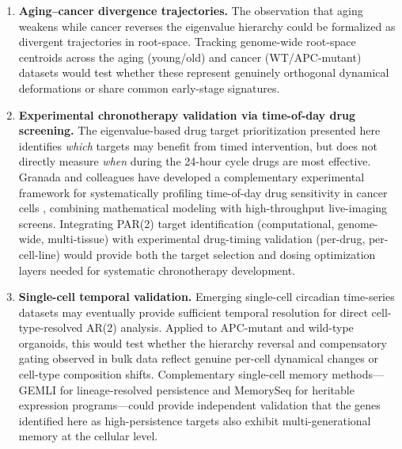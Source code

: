 \documentclass[11pt,letterpaper]{article}
\begin{document}
\begin{enumerate}[leftmargin=*, label=\textbf{\arabic*.}]
\item \textbf{Aging--cancer divergence trajectories.} The observation that aging weakens while cancer reverses the eigenvalue hierarchy could be formalized as divergent trajectories in root-space. Tracking genome-wide root-space centroids across the aging (young/old) and cancer (WT/APC-mutant) datasets would test whether these represent genuinely orthogonal dynamical deformations or share common early-stage signatures.

\item \textbf{Experimental chronotherapy validation via time-of-day drug screening.} The eigenvalue-based drug target prioritization presented here identifies \textit{which} targets may benefit from timed intervention, but does not directly measure \textit{when} during the 24-hour cycle drugs are most effective. Granada and colleagues have developed a complementary experimental framework for systematically profiling time-of-day drug sensitivity in cancer cells \citep{granada2024phenotyping, granada2025drivers}, combining mathematical modeling with high-throughput live-imaging screens. Integrating PAR(2) target identification (computational, genome-wide, multi-tissue) with experimental drug-timing validation (per-drug, per-cell-line) would provide both the target selection and dosing optimization layers needed for systematic chronotherapy development.

\item \textbf{Single-cell temporal validation.} Emerging single-cell circadian time-series datasets may eventually provide sufficient temporal resolution for direct cell-type-resolved AR(2) analysis. Applied to APC-mutant and wild-type organoids, this would test whether the hierarchy reversal and compensatory gating observed in bulk data reflect genuine per-cell dynamical changes or cell-type composition shifts. Complementary single-cell memory methods---GEMLI \citep{eisele2024gemli} for lineage-resolved persistence and MemorySeq \citep{raj2020memoryseq} for heritable expression programs---could provide independent validation that the genes identified here as high-persistence targets also exhibit multi-generational memory at the cellular level.

\end{enumerate}
\end{document}
